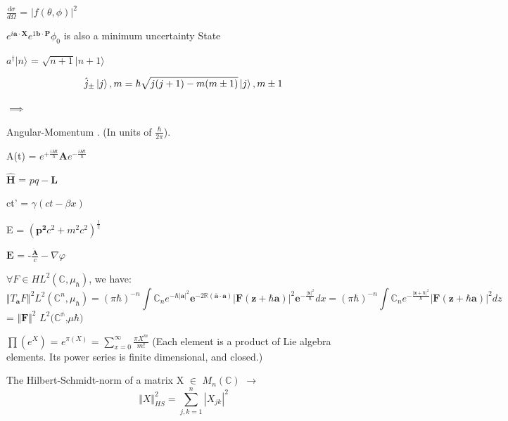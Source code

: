 \documentclass[a4paper, 10pt, onepage]{elegantbook}
\begin{document}
\begin{note}
 $\frac{d \sigma} {d \Omega}$ = $|f(\theta, \phi)|^2$

 $ e^{i \mathbf a \cdot \mathbf X} e^{1 \mathbf b \cdot \mathbf P} \phi_0$ is also a minimum uncertainty State

 $a^\dagger |n \rangle$ = $\sqrt{n + 1} |n +1 \rangle$

\begin{equation}
{\hat j_\pm} \ket j,m = \hbar \sqrt{j (j + 1) - m(m \pm 1)} \ket j, m \pm 1
\end{equation}

$\implies$

Angular-Momentum .
\quad (In units of $\frac{\hbar}{2\pi}$).
  
A(t) = $e^{+ \frac{iHt}{h}} \mathbf {A}e^{- \frac{iHt}{h}}$
  
$\hat{\mathbf{H}}$ = $p \hat q - \mathbf L$
 
ct' = $ \gamma(ct - \beta x)$
 
E = $ ( \mathbf {p^2} c^2 + m^2 c^2)^ \frac{1}{2}$

$ \mathbf E$ = -$ \frac{\mathbf {\dot A}}{c} - \nabla \varphi$
 
$ \forall F \in H L^2(\mathbb C,\mu_\hbar)$, we have:
\begin{equation}
\Vert T_\mathbf a F \Vert^2 L^2(\mathbb C^n,\mu_\hbar)
= (\pi \hbar)^{-n} \int \mathbb C_n  e^{- \hbar \vert \mathbf{a} \vert^2}  \mathbf{e}^{-2 \mathbb{R} (\bar{\mathbf{a}} 
\cdot {\mathbf{a}})} \vert \mathbf F (\mathbf z + \hbar \mathbf a ) \vert^2  \mathbf e^{- \frac{\vert \mathbf x 
\vert^2} {\hbar}}  dx
= (\pi \hbar)^{-n} \int \mathbb C_n e^{- \frac{\vert \mathbf z + \hbar \vert^2}{\hbar}} \vert \mathbf F(\mathbf z 
+\hbar \mathbf a) \vert^2 dz
\end{equation}
\noindent
= $\Vert \mathbf{F} \Vert^2$ $L^2(\mathbb{C^n}$,$\mu \hbar)$
  
$\prod (e^X)$ = $e^{\pi (X)}$ = $ \sum_{x=0}^\infty \frac{\pi X^m}{m!}$ (Each element is a product of Lie algebra 
elements. Its power series is finite dimensional, and closed.)
                                                                  
The Hilbert-Schmidt-norm of a matrix X $\in$ $M_n(\mathbb C)$ $\longrightarrow$
\begin{equation}
\Vert X \Vert^2_{HS} = \sum_{j,k = 1}^{n} |X_{jk}|^2
\end{equation}
  

\end{note}
\end{document}

